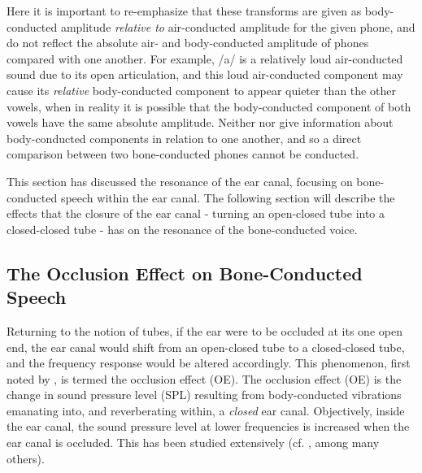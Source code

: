 Here it is important to re-emphasize that these transforms are given as body-conducted amplitude \textit{relative to} air-conducted amplitude for the given phone, and do not reflect the absolute air- and body-conducted amplitude of phones compared with one another.  For example, /a/ is a relatively loud air-conducted sound due to its open articulation, and this loud air-conducted component may cause its \textit{relative} body-conducted component to appear quieter than the other vowels, when in reality it is possible that the body-conducted component of both vowels have the same absolute amplitude.  Neither \cite{bekesy:60} nor \cite{reinfeldt:10} give information about body-conducted components in relation to one another, and so a direct comparison between two bone-conducted phones cannot be conducted.

This section has discussed the resonance of the ear canal, focusing on bone-conducted speech within the ear canal.  The following section will describe the effects that the closure of the ear canal - turning an open-closed tube into a closed-closed tube - has on the resonance of the bone-conducted voice.


\subsection{The Occlusion Effect on Bone-Conducted Speech}\label{sec:OEBCspeech}



Returning to the notion of tubes, if the ear were to be occluded at its one open end, the ear canal would shift from an open-closed tube to a closed-closed tube, and the frequency response would be altered accordingly.  This phenomenon, first noted by \cite{wheatstone:79}, is termed the occlusion effect (OE).  The occlusion effect (OE) is the change in sound pressure level (SPL) resulting from body-conducted vibrations emanating into, and reverberating within, a \textit{closed} ear canal.  Objectively, inside the ear canal, the sound pressure level at lower frequencies is increased when the ear canal is occluded.  This has been studied extensively (cf. \cite{wheatstone:79,kelly:37,littler:52,tonndorf:66}, among many others).  %


